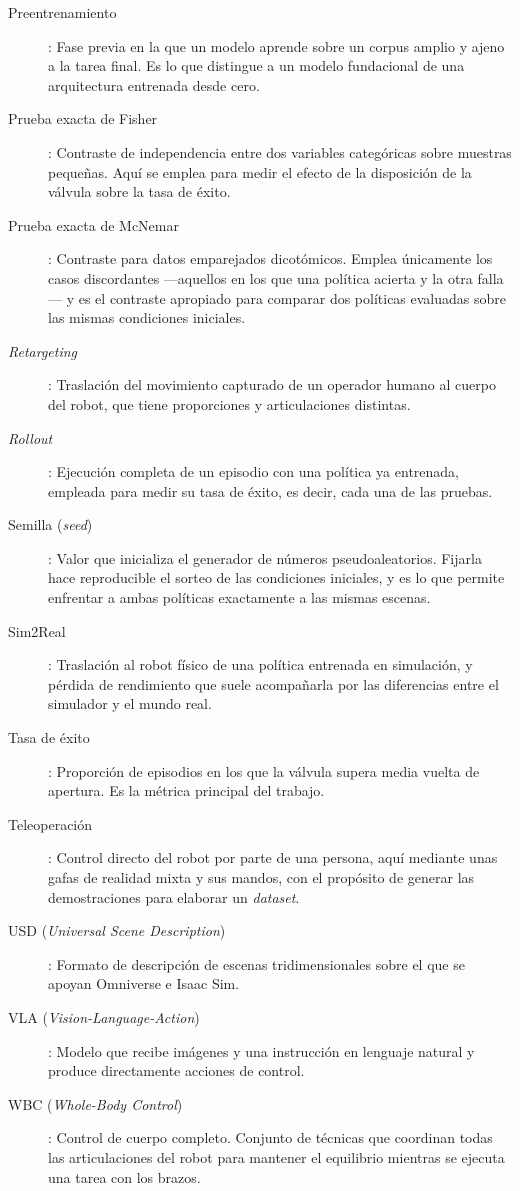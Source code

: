 \begin{description}
	\item[Preentrenamiento]: Fase previa en la que un modelo aprende sobre un corpus amplio y ajeno
	a la tarea final. Es lo que distingue a un modelo fundacional de una arquitectura entrenada
	desde cero.

	\item[Prueba exacta de Fisher]: Contraste de independencia entre dos variables categóricas
	sobre muestras pequeñas. Aquí se emplea para medir el efecto de la disposición de la válvula
	sobre la tasa de éxito.

	\item[Prueba exacta de McNemar]: Contraste para datos emparejados dicotómicos. Emplea
	únicamente los casos discordantes —aquellos en los que una política acierta y la otra falla— y
	es el contraste apropiado para comparar dos políticas evaluadas sobre las mismas condiciones
	iniciales.

	\item[\textit{Retargeting}]: Traslación del movimiento capturado de un operador humano al cuerpo
	del robot, que tiene proporciones y articulaciones distintas.

	\item[\textit{Rollout}]: Ejecución completa de un episodio con una política ya entrenada,
	empleada para medir su tasa de éxito, es decir, cada una de las pruebas.

	\item[Semilla (\textit{seed})]: Valor que inicializa el generador de números pseudoaleatorios.
	Fijarla hace reproducible el sorteo de las condiciones iniciales, y es lo que permite enfrentar
	a ambas políticas exactamente a las mismas escenas.

	\item[Sim2Real]: Traslación al robot físico de una política entrenada en simulación, y pérdida
	de rendimiento que suele acompañarla por las diferencias entre el simulador y el mundo real.

	\item[Tasa de éxito]: Proporción de episodios en los que la válvula supera media vuelta de
	apertura. Es la métrica principal del trabajo.

	\item[Teleoperación]: Control directo del robot por parte de una persona, aquí mediante unas
	gafas de realidad mixta y sus mandos, con el propósito de generar las demostraciones para
	elaborar un \textit{dataset}.

	\item[USD (\textit{Universal Scene Description})]: Formato de descripción de escenas
	tridimensionales sobre el que se apoyan Omniverse e Isaac Sim.

	\item[VLA (\textit{Vision-Language-Action})]: Modelo que recibe imágenes y una instrucción en
	lenguaje natural y produce directamente acciones de control.

	\item[WBC (\textit{Whole-Body Control})]: Control de cuerpo completo. Conjunto de técnicas que
	coordinan todas las articulaciones del robot para mantener el equilibrio mientras se ejecuta
	una tarea con los brazos.

\end{description}
